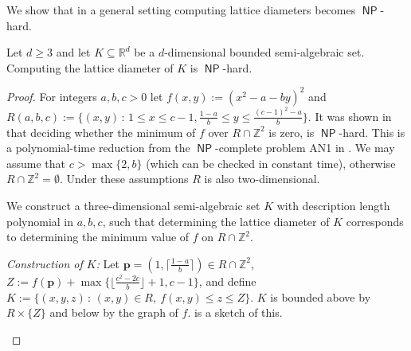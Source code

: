 \documentclass[11pt]{article}
\newcommand{\Anouksays}[1]{\textcolor{orange}{\textbf{\underline{Anouk says:}} #1}}
\newcommand{\bp}{\mathbf{p}}
\newcommand{\R}{\mathbb{R}}
\newcommand{\Z}{\mathbb{Z}}
\DeclareMathOperator{\NP}{\mathsf{NP}} %
\newcommand{\st}{\, \mathrm{:}\,}
\begin{document}
We show that in a general setting computing lattice diameters becomes $\NP$-hard.

\begin{theorem}\label{thm:NP-hard}
     Let $d \geq 3$ and let $K \subseteq \R^d$ be a $d$-dimensional bounded semi-algebraic set. \mbox{Computing} the lattice diameter of $K$ is $\NP$-hard.
\end{theorem}

\begin{proof}
For integers $a,b,c>0$ let $f(x,y):=(x^2-a-by)^2$ and $R(a,b,c):=\{ (x,y) \st 1 \leq x \leq c-1, \frac{1-a}{b} \leq y \leq \frac{(c-1)^2-a}{b}\}$.
It was shown in~\cite[Lemma 2.1]{Lemma2.1} that deciding whether the minimum of $f$ over $R \cap \Z^2$ is zero, is $\NP$-hard. This is a polynomial-time reduction from the $\NP$-complete problem AN1 in \cite[p.~249]{GJ}. We may assume that $c>\max\{2,b\}$ (which can be checked in constant time), otherwise $R \cap \Z^2 = \emptyset$. Under these assumptions $R$ is also two-dimensional.



We construct a three-dimensional semi-algebraic set $K$ with description length polynomial in $a,b,c$, such that determining the lattice diameter of $K$ corresponds to determining the minimum value of $f$ on $R \cap\Z^2$.

\textit{Construction of $K$:} Let $\bp=(1,\lceil \frac{1-a}{b} \rceil ) \in R \cap \Z^2$, $Z:=f(\bp) + \max\{  \lfloor \frac{c^2-2c}{b}\rfloor +1,c-1\}$, and define $ K:= \{ (x,y,z) \st (x,y) \in R, \ f(x,y) \leq z \leq Z \}.$ $K$ is bounded above by $R \times \{Z\}$ and below by the graph of $f$.  is a sketch of this. 

\begin{figure}[h!]
\centering
{}
\end{figure}
\end{proof}
\end{document}
